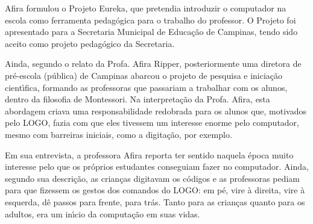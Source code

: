 \documentclass[
12pt,		%
openright,	%
twoside,  %
a4paper,			%
chapter=TITLE,		%
english,			%
french,				%
spanish,			%
brazil				%
]{USPSC-classe/USPSC}
\begin{document}
Afira formulou o Projeto Eureka, que pretendia introduzir o computador na escola como ferramenta pedag\'ogica para o trabalho do professor. O Projeto foi apresentado para a Secretaria Municipal de Educa\c{c}\~ao de Campinas, tendo sido aceito como projeto pedag\'ogico da Secretaria.

















Ainda, segundo o relato da Profa. Afira Ripper, posteriormente uma diretora de pr\'e-escola (p\'ublica) de Campinas abarcou o projeto de pesquisa e inicia\c{c}\~ao cient\'{\i}fica, formando as professoras que passariam a trabalhar com os alunos, dentro da filosofia de Montessori. Na interpreta\c{c}\~ao da Profa. Afira, esta abordagem criava uma responsabilidade redobrada para os alunos que, motivados pelo LOGO, fazia com que eles tivessem um interesse enorme pelo computador, mesmo com barreiras iniciais, como a digita\c{c}\~ao, por exemplo.

















Em sua entrevista, a professora Afira reporta ter sentido naquela \'epoca muito interesse pelo que os pr\'oprios estudantes conseguiam fazer no computador. Ainda, segundo sua descri\c{c}\~ao, as crian\c{c}as digitavam os c\'odigos e as professoras pediam para que fizessem os gestos dos comandos do LOGO: \textquotedbl em p\'e\textquotedbl , \textquotedbl vire \`a direita\textquotedbl , \textquotedbl vire \`a esquerda\textquotedbl , \textquotedbl d\^e passos para frente\textquotedbl , \textquotedbl para tr\'as\textquotedbl . Tanto para as crian\c{c}as quanto para os adultos, era um in\'{\i}cio da computa\c{c}\~ao em suas vidas.
\end{document}

